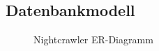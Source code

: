 \subsection{Datenbankmodell}
\label{app:ERD}
\begin{figure}[htb]
\centering
{}
\caption{Nightcrawler ER-Diagramm}
\end{figure}